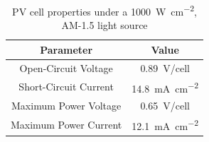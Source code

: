 

\begin{table}[!t]
    \renewcommand{\arraystretch}{1.2}
    \centering
    \caption{PV cell properties under a \SI{1000}{\watt\per\square\centi\meter}, AM-1.5 light source}
    \label{tab:pvcell}
    \begin{tabular}{|c|c|}
    \hline
    \textbf{Parameter} & \textbf{Value}\\
    \hline
    Open-Circuit Voltage & \SI{0.89}{\volt}/cell\\
    Short-Circuit Current & \SI{14.8}{\milli\ampere\per\square\centi\meter}\\
    Maximum Power Voltage & \SI{0.65}{\volt}/cell\\ 
    Maximum Power Current & \SI{12.1}{\milli\ampere\per\square\centi\meter}\\
    \hline
    \end{tabular}
\end{table}


